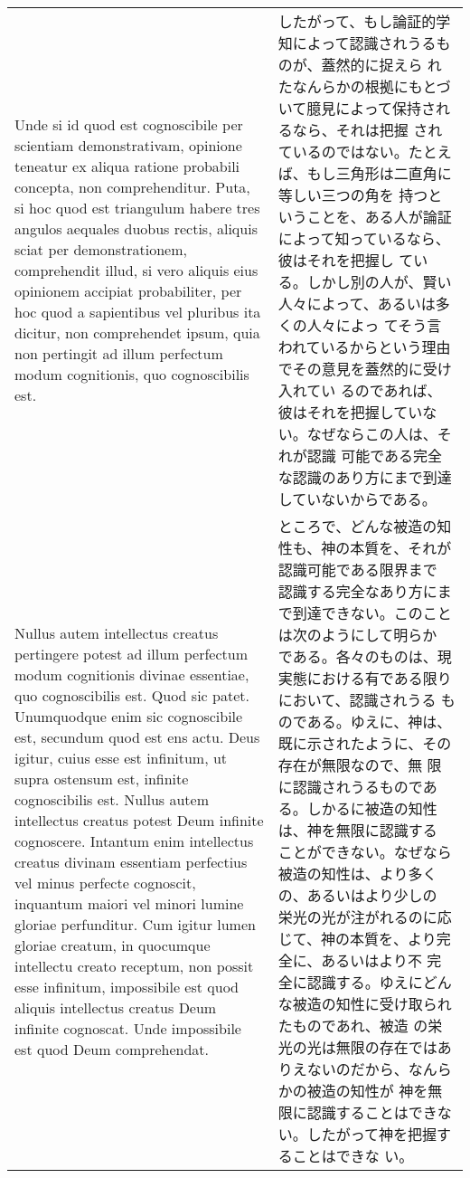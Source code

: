 \documentclass[10pt]{jsarticle} %
\begin{document}
\begin{longtable}{p{21em}p{21em}}
\\

Unde si id quod est cognoscibile per scientiam demonstrativam,
opinione teneatur ex aliqua ratione probabili concepta, non
comprehenditur. Puta, si hoc quod est triangulum habere tres angulos
aequales duobus rectis, aliquis sciat per demonstrationem,
comprehendit illud, si vero aliquis eius opinionem accipiat
probabiliter, per hoc quod a sapientibus vel pluribus ita dicitur, non
comprehendet ipsum, quia non pertingit ad illum perfectum modum
cognitionis, quo cognoscibilis est.

&

したがって、もし論証的学知によって認識されうるものが、蓋然的に捉えら
れたなんらかの根拠にもとづいて臆見によって保持されるなら、それは把握
されているのではない。たとえば、もし三角形は二直角に等しい三つの角を
持つということを、ある人が論証によって知っているなら、彼はそれを把握し
ている。しかし別の人が、賢い人々によって、あるいは多くの人々によっ
てそう言われているからという理由でその意見を蓋然的に受け入れてい
るのであれば、彼はそれを把握していない。なぜならこの人は、それが認識
可能である完全な認識のあり方にまで到達していないからである。

\\

Nullus autem intellectus creatus pertingere potest ad illum perfectum
modum cognitionis divinae essentiae, quo cognoscibilis est. Quod sic
patet. Unumquodque enim sic cognoscibile est, secundum quod est ens
actu. Deus igitur, cuius esse est infinitum, ut supra ostensum est,
infinite cognoscibilis est. Nullus autem intellectus creatus potest
Deum infinite cognoscere. Intantum enim intellectus creatus divinam
essentiam perfectius vel minus perfecte cognoscit, inquantum maiori
vel minori lumine gloriae perfunditur. Cum igitur lumen gloriae
creatum, in quocumque intellectu creato receptum, non possit esse
infinitum, impossibile est quod aliquis intellectus creatus Deum
infinite cognoscat. Unde impossibile est quod Deum comprehendat.

&

ところで、どんな被造の知性も、神の本質を、それが認識可能である限界まで
認識する完全なあり方にまで到達できない。このことは次のようにして明らか
である。各々のものは、現実態における有である限りにおいて、認識されうる
ものである。ゆえに、神は、既に示されたように、その存在が無限なので、無
限に認識されうるものである。しかるに被造の知性は、神を無限に認識する
ことができない。なぜなら被造の知性は、より多くの、あるいはより少しの
栄光の光が注がれるのに応じて、神の本質を、より完全に、あるいはより不
完全に認識する。ゆえにどんな被造の知性に受け取られたものであれ、被造
の栄光の光は無限の存在ではありえないのだから、なんらかの被造の知性が
神を無限に認識することはできない。したがって神を把握することはできな
い。


\end{longtable}
\end{document}
